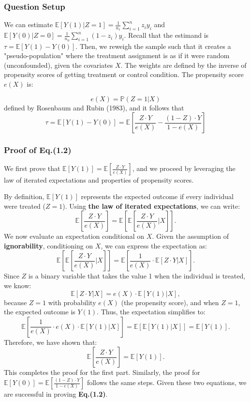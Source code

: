 \subsubsection{Question Setup}
We can estimate \(\mathbb{E}[Y(1)|Z=1] = \frac{1}{n_1}\sum^n_{i=1}z_i y_i\) and \(\mathbb{E}[Y(0)|Z=0] = \frac{1}{n_0}\sum^n_{i=1}(1-z_i)y_i\). Recall that the estimand is \(\tau = \mathbb{E}[Y(1)-Y(0)]\). Then, we reweigh the sample such that it creates a "pseudo-population" where the treatment assignment is as if it were random (unconfounded), given the covariates \(X\). The weights are defined by the inverse of propensity scores of getting treatment or control condition. The propensity score \(e(X)\) is:

\begin{equation}
    e(X) = \mathbb{P}(Z=1 | X)
\end{equation}
defined by Rosenbaum and Rubin (1983), and it follows that
\begin{equation}
    \tau = \mathbb{E}[Y(1)-Y(0)] = \mathbb{E}[\frac{Z\cdot Y}{e(X)}-\frac{(1-Z)\cdot Y }{1-e(X)}]
\end{equation}

\subsubsection{Proof of Eq.(1.2)}
We first prove that \(\mathbb{E}[Y(1)] = \mathbb{E}[\frac{Z\cdot Y}{e(X)}]\), and we proceed by leveraging the law of iterated expectations and properties of propensity scores. 

By definition, \(\mathbb{E}[Y(1)]\) represents the expected outcome if every individual were treated (\(Z = 1\)). Using \textbf{the law of iterated expectations}, we can write:
\[
\mathbb{E}\left[\frac{Z \cdot Y}{e(X)}\right] = \mathbb{E}\left[\mathbb{E}\left[\frac{Z \cdot Y}{e(X)} \bigg| X\right]\right].
\]
We now evaluate an expectation conditional on \(X\). Given the assumption of \textbf{ignorability}, conditioning on \(X\), we can express the expectation as:
\[
\mathbb{E}\left[\mathbb{E}\left[\frac{Z \cdot Y}{e(X)} \bigg| X\right]\right] = \mathbb{E}\left[\frac{1}{e(X)} \cdot \mathbb{E}[Z \cdot Y | X]\right].
\]
Since \(Z\) is a binary variable that takes the value 1 when the individual is treated, we know:
\[
\mathbb{E}[Z \cdot Y | X] = e(X) \cdot \mathbb{E}[Y(1) | X],
\]
because \(Z = 1\) with probability \(e(X)\) (the propensity score), and when \(Z = 1\), the expected outcome is \(Y(1)\).
Thus, the expectation simplifies to:
\[
\mathbb{E}\left[\frac{1}{e(X)} \cdot e(X) \cdot \mathbb{E}[Y(1) | X]\right] = \mathbb{E}\left[\mathbb{E}[Y(1) | X]\right] = \mathbb{E}[Y(1)].
\]
Therefore, we have shown that:
\[
\mathbb{E}\left[\frac{Z \cdot Y}{e(X)}\right] = \mathbb{E}[Y(1)].
\]
This completes the proof for the first part. Similarly, the proof for \(\mathbb{E}[Y(0)] = \mathbb{E}\left[\frac{(1-Z) \cdot Y}{1-e(X)}\right]\) follows the same steps. Given these two equations, we are successful in proving \textbf{Eq.(1.2)}.

